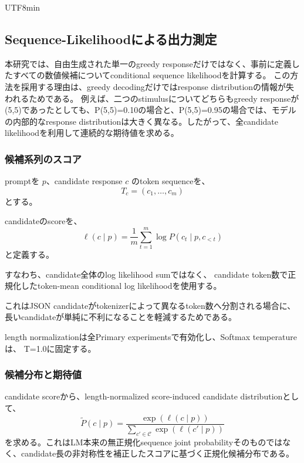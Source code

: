 \documentclass{article} %
\begin{document}
\begin{CJK*}{UTF8}{min}
\subsection{Sequence-Likelihoodによる出力測定}
\label{app:sequence_likelihood}

本研究では、自由生成された単一のgreedy responseだけではなく、事前に定義したすべての数値候補についてconditional sequence likelihoodを計算する。
この方法を採用する理由は、greedy decodingだけではresponse distributionの情報が失われるためである。
例えば、二つのstimulusについてどちらもgreedy responseが(5,5)であったとしても、P(5,5)=0.10の場合と、P(5,5)=0.95の場合では、モデルの内部的なresponse distributionは大きく異なる。したがって、全candidate likelihoodを利用して連続的な期待値を求める。


\subsubsection{候補系列のスコア}

promptを \(p\)、candidate response \(c\) のtoken sequenceを、
\[
T_c
=
(c_1,\ldots,c_m)
\]
とする。

candidateのscoreを、
\[
\ell(c\mid p)
=
\frac{1}{m}
\sum_{t=1}^{m}
\log
P(c_t\mid p,c_{<t})
\]
と定義する。

すなわち、candidate全体のlog likelihood sumではなく、
candidate token数で正規化したtoken-mean conditional log likelihoodを使用する。

これはJSON candidateがtokenizerによって異なるtoken数へ分割される場合に、長いcandidateが単純に不利になることを軽減するためである。

length normalizationは全Primary experimentsで有効化し、Softmax temperatureは、
T=1.0に固定する。


\subsubsection{候補分布と期待値}

candidate scoreから、length-normalized score-induced candidate distributionとして、
\[
\tilde{P}(c\mid p)
=
\frac{
\exp(\ell(c\mid p))
}{
\sum_{c'\in\mathcal{C}}
\exp(\ell(c'\mid p))
}
\]
を求める。これはLM本来の無正規化sequence joint probabilityそのものではなく、candidate長の非対称性を補正したスコアに基づく正規化候補分布である。


\end{CJK*}
\end{document}
